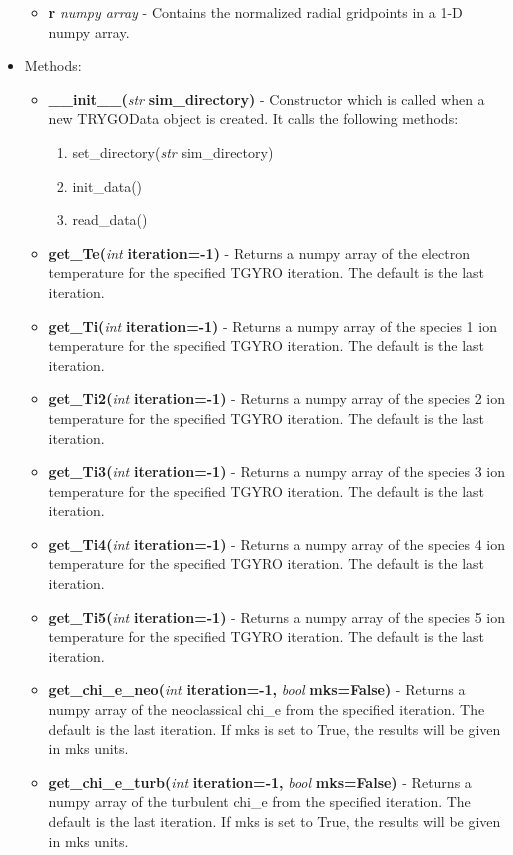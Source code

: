 \documentclass{article}
\begin{document}
\begin{itemize}
\begin{itemize}
\item \textbf{r} \emph{numpy array} - Contains the normalized radial gridpoints in a 1-D numpy array.
\end{itemize}
\item Methods:
\begin{itemize}
\item \textbf{\_\_init\_\_(}\emph{str} \textbf{ sim\_directory)} - Constructor which is called when a new TRYGOData object is created.  It calls the following methods:
\begin{enumerate}
\item set\_directory(\emph{str} sim\_directory)
\item init\_data()
\item read\_data()
\end{enumerate}
\item \textbf{get\_Te(}\emph{int}\textbf{ iteration=-1)} - Returns a numpy array of the electron temperature for the specified TGYRO iteration.  The default is the last iteration.
\item \textbf{get\_Ti(}\emph{int}\textbf{ iteration=-1)} - Returns a numpy array of the species 1 ion temperature for the specified TGYRO iteration.  The default is the last iteration.
\item \textbf{get\_Ti2(}\emph{int}\textbf{ iteration=-1)} - Returns a numpy array of the species 2 ion temperature for the specified TGYRO iteration.  The default is the last iteration.
\item \textbf{get\_Ti3(}\emph{int}\textbf{ iteration=-1)} - Returns a numpy array of the species 3 ion temperature for the specified TGYRO iteration.  The default is the last iteration.
\item \textbf{get\_Ti4(}\emph{int}\textbf{ iteration=-1)} - Returns a numpy array of the species 4 ion temperature for the specified TGYRO iteration.  The default is the last iteration.
\item \textbf{get\_Ti5(}\emph{int}\textbf{ iteration=-1)} - Returns a numpy array of the species 5 ion temperature for the specified TGYRO iteration.  The default is the last iteration.
\item \textbf{get\_chi\_e\_neo(}\emph{int}\textbf{ iteration=-1,}\emph{ bool}\textbf{ mks=False)} - Returns a numpy array of the neoclassical chi\_e from the specified iteration.  The default is the last iteration.  If mks is set to True, the results will be given in mks units.
\item \textbf{get\_chi\_e\_turb(}\emph{int}\textbf{ iteration=-1,}\emph{ bool}\textbf{ mks=False)} - Returns a numpy array of the turbulent chi\_e from the specified iteration.  The default is the last iteration.  If mks is set to True, the results will be given in mks units.

\end{itemize}
\end{itemize}
\end{document}
